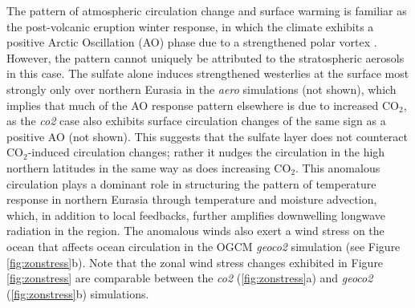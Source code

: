 \documentclass[12pt]{article}
\begin{document}
The pattern of atmospheric circulation change and surface warming is familiar as the post-volcanic eruption winter response, in which the climate exhibits a positive Arctic Oscillation (AO) phase due to a strengthened polar vortex \citep{robock00, stenchikov02, shindell04}. However, the pattern cannot uniquely be attributed to the stratospheric aerosols in this case. The sulfate alone induces strengthened westerlies at the surface most strongly only over northern Eurasia in the \textit{aero} simulations (not shown), which implies that much of the AO response pattern elsewhere is due to increased CO$_2$, as the \textit{co2} case also exhibits surface circulation changes of the same sign as a positive AO (not shown). This suggests that the sulfate layer does not counteract CO$_2$-induced circulation changes; rather it nudges the circulation in the high northern latitudes in the same way as does increasing CO$_2$. This anomalous circulation plays a dominant role in structuring the pattern of temperature response in northern Eurasia through temperature and moisture advection, which, in addition to local feedbacks, further amplifies downwelling longwave radiation in the region. The anomalous winds also exert a wind stress on the ocean that affects ocean circulation in the OGCM \textit{geoco2} simulation (see Figure \ref{fig:zonstress}b). Note that the zonal wind stress changes exhibited in Figure \ref{fig:zonstress} are comparable between the \textit{co2} (\ref{fig:zonstress}a) and \textit{geoco2} (\ref{fig:zonstress}b) simulations. 
\end{document}
